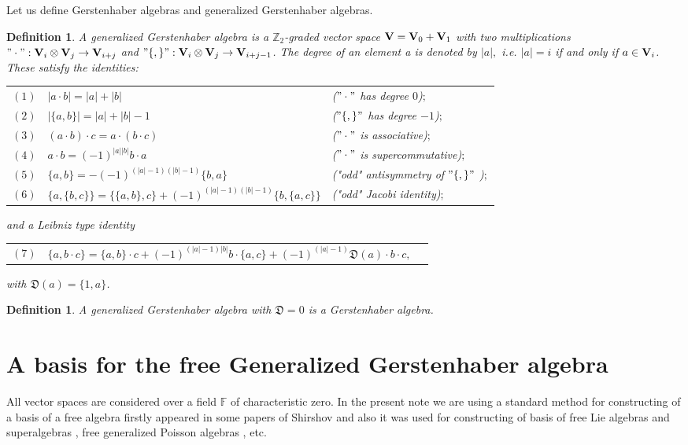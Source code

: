 \documentclass[secthm,seceqn,amsthm,ussrhead,reqno,12pt]{amsart}
\theoremstyle{plain}
\newtheorem{definition}[theorem]{Definition}
\begin{document}
	\medskip 
	
	Let us define   Gerstenhaber algebras and generalized Gerstenhaber algebras. 
	\begin{definition}
	
A generalized Gerstenhaber algebra is a $\mathbb{Z}_2$-graded vector space ${\bf V}={\bf V}_0+{\bf V}_1$ with two multiplications 
$"\cdot": {\bf V}_i \otimes {\bf V}_j \to {\bf V}_{i+j}$ and 
$"\{ , \}": {\bf V}_i \otimes {\bf V}_j \to {\bf V}_{i+j-1}$. 
The degree of an element a is denoted by $|a|,$ i.e.  $|a|=i$ if and only if $a\in {\bf V}_i$. These satisfy the identities:
\begin{longtable}{lll}
	$(1)$ &  $|a\cdot b| = |a| + |b|$ & ($"\cdot"$ has degree $0$)$;$\\
	$(2)$ & $|\{a,b\}| = |a| + |b| - 1$ & ($"\{  , \}"$  has degree $-1$)$;$\\
	$(3)$ & $(a\cdot b)\cdot c = a\cdot (b\cdot c)$ & ($"\cdot"$  is associative)$;$\\
	$(4)$ & $a\cdot b = (-1)^{|a||b|}b\cdot a$ & ($"\cdot"$ is supercommutative)$;$\\
	$(5)$ & $\{a,b\} = -(-1)^{(|a|-1)(|b|-1)} \{b,a\}$ & ("odd" antisymmetry of $"\{  , \}"$ )$;$\\
	$(6)$ & $\{a,\{b,c\}\}  = \{\{ a,b \},c\} + (-1)^{(|a|-1)(|b|-1)}\{b,\{a,c\}\}$ & ("odd" Jacobi identity)$;$\\
\end{longtable}
and a Leibniz type identity 
\begin{longtable}{lll}
	$(7)$ & $\{a,b\cdot c\} = \{a,b\} \cdot c + (-1)^{(|a|-1)|b|}b\cdot \{a,c\}+(-1)^{(|a|-1)} \mathfrak {\mathfrak D}(a) \cdot b \cdot c,$ 
\end{longtable}
	with
	$\mathfrak  {\mathfrak D}(a)=\{1,a\}$.

\end{definition}
 

 
		\begin{definition}
	A generalized Gerstenhaber algebra with 	$\mathfrak  D=0$ is a  Gerstenhaber algebra.
	\end{definition}
	
	
 
	
	
 \newpage
\section*{A basis for the free Generalized Gerstenhaber algebra}
	All vector spaces are considered over a field $\mathbb{F}$
	of characteristic zero. 
	In the present note we are using a standard method for constructing of a basis of a free algebra firstly appeared in some  papers of Shirshov \cite{shirshov} and also it was used for constructing of basis of free
	Lie algebras and superalgebras \cite{chi},
	free generalized Poisson algebras \cite{K17}, etc.
\end{document}
